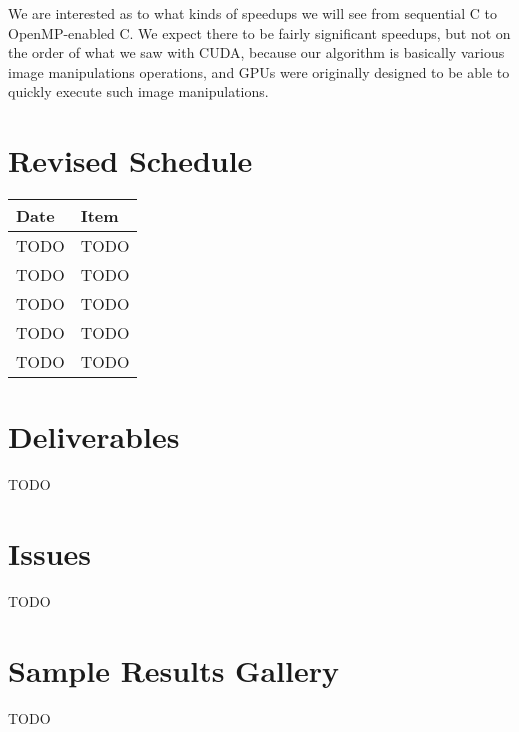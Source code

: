 \documentclass[12pt]{article}
\begin{document}
We are interested as to what kinds of speedups we will see from sequential C to
OpenMP-enabled C. We expect there to be fairly significant speedups, but not on
the order of what we saw with CUDA, because our algorithm is basically various
image manipulations operations, and GPUs were originally designed to be able to
quickly execute such image manipulations.

\section{Revised Schedule}

\begin{tabular}{l|l}
    Date & Item \\
    \hline
    TODO & TODO \\
    TODO & TODO \\
    TODO & TODO \\
    TODO & TODO \\
    TODO & TODO
\end{tabular}

\section{Deliverables}

TODO

\section{Issues}

TODO

\section{Sample Results Gallery}

TODO
\end{document}
